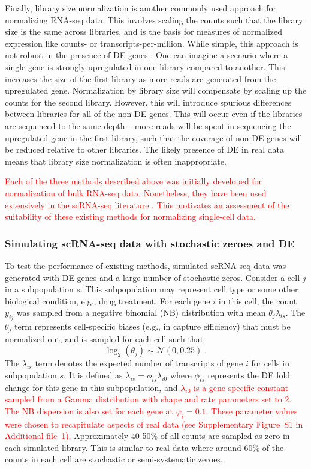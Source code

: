 \documentclass{bmcart}
\newcommand{\suppkleinparam}{S1}
\newcommand{\revised}[1]{\textcolor{red}{#1}}
\begin{document}
Finally, library size normalization is another commonly used approach for normalizing RNA-seq data.
This involves scaling the counts such that the library size is the same across libraries,
    and is the basis for measures of normalized expression like counts- or transcripts-per-million.
While simple, this approach is not robust in the presence of DE genes \cite{robinson2010scaling}.
One can imagine a scenario where a single gene is strongly upregulated in one library compared to another.
This increases the size of the first library as more reads are generated from the upregulated gene.
Normalization by library size will compensate by scaling up the counts for the second library.
However, this will introduce spurious differences between libraries for all of the non-DE genes.
This will occur even if the libraries are sequenced to the same depth 
    -- more reads will be spent in sequencing the upregulated gene in the first library, such that the coverage of non-DE genes will be reduced relative to other libraries.
The likely presence of DE in real data means that library size normalization is often inappropriate.

\revised{Each of the three methods described above was initially developed for normalization of bulk RNA-seq data.
Nonetheless, they have been used extensively in the scRNA-seq literature \cite{saraiva2015hierarchical, kolod2015single, llorens2015singlecell, li2016singlecell, deng2014singlecell, freeman2015singlecell}.
This motivates an assessment of the suitability of these existing methods for normalizing single-cell data.
}

\subsubsection*{Simulating scRNA-seq data with stochastic zeroes and DE}
To test the performance of existing methods, simulated scRNA-seq data was generated with DE genes and a large number of stochastic zeros.
Consider a cell $j$ in a subpopulation $s$.
This subpopulation may represent cell type or some other biological condition, e.g., drug treatment. 
For each gene $i$ in this cell, the count $y_{ij}$ was sampled from a negative binomial (NB) distribution with mean $\theta_{j}\lambda_{is}$.
The $\theta_{j}$ term represents cell-specific biases (e.g., in capture efficiency) that must be normalized out, 
    and is sampled for each cell such that 
\[
\log_2(\theta_j) \sim \mathcal{N}(0, 0.25) \;.
\]
The $\lambda_{is}$ term denotes the expected number of transcripts of gene $i$ for cells in subpopulation $s$.
It is defined as $\lambda_{is}=\phi_{is}\lambda_{i0}$ where $\phi_{is}$ represents the DE fold change for this gene in this subpopulation, and \revised{$\lambda_{i0}$ is a gene-specific constant sampled from a Gamma distribution with shape and rate parameters set to 2.
The NB dispersion is also set for each gene at $\varphi_i = 0.1$.
These parameter values were chosen to recapitulate aspects of real data \cite{klein2015droplet} (see Supplementary Figure~\suppkleinparam{} in Additional file~1).}
Approximately 40-50\% of all counts are sampled as zero in each simulated library.
This is similar to real data where around 60\% of the counts in each cell are stochastic or semi-systematic zeroes.
\end{document}
